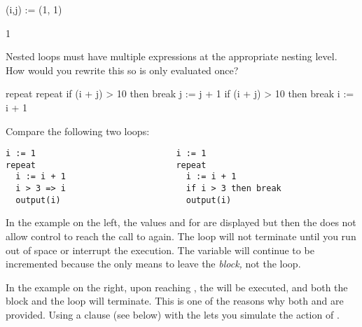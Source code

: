 {\begin{xtc}
\begin{spadsrc}
(i,j) := (1, 1) 
\end{spadsrc}
\begin{TeXOutput}
\begin{fricasmath}{3}
1%
\end{fricasmath}
\end{TeXOutput}
\end{xtc}
\begin{xtc}
\begin{xtccomment}
Nested loops must have multiple 
expressions at the appropriate nesting level.
How would you rewrite this so  is only evaluated once?
\end{xtccomment}
\begin{spadsrc}
repeat
  repeat
    if (i + j) > 10 then break
    j := j + 1
  if (i + j) > 10 then break
  i := i + 1
\end{spadsrc}
\end{xtc}


Compare the following two loops:

\begin{verbatim}
i := 1                            i := 1
repeat                            repeat
  i := i + 1                        i := i + 1
  i > 3 => i                        if i > 3 then break
  output(i)                         output(i)
\end{verbatim}

In the example on the left, the values
 and  for  are displayed
but then the \spadSyntax{=>} does not allow control to reach the call to
 again.
The loop will not terminate
until you run out of space or interrupt the execution.
The variable  will continue to be incremented because
the \spadSyntax{=>} only means to leave the {\it block,} not the loop.

In the example on the right,
upon reaching , the  will be
executed, and both the block and the loop will terminate.
This is one of the reasons why both \spadSyntax{=>} and  are
provided.
Using a  clause (see below) with the \spadSyntax{=>}
lets you simulate the action of .

}
